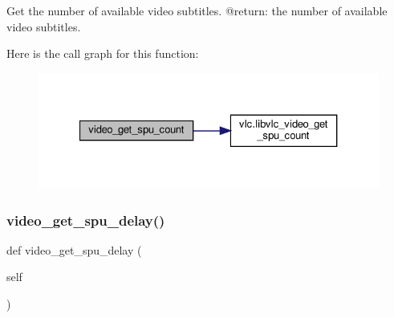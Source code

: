 \begin{DoxyVerb}Get the number of available video subtitles.
@return: the number of available video subtitles.
\end{DoxyVerb}
 Here is the call graph for this function\+:
\nopagebreak
\begin{figure}[H]
\begin{center}
\leavevmode
\includegraphics[width=327pt]{classvlc_1_1_media_player_a57b4b64ec9386749a6b4b16e2578423c_cgraph}
\end{center}
\end{figure}
\mbox{\label{classvlc_1_1_media_player_a0740b3afdcb610907d0c82358d09f5a6}} 
\subsubsection{\texorpdfstring{video\+\_\+get\+\_\+spu\+\_\+delay()}{video\_get\_spu\_delay()}}
{\footnotesize\ttfamily def video\+\_\+get\+\_\+spu\+\_\+delay (\begin{DoxyParamCaption}\item[{}]{self }\end{DoxyParamCaption})}

